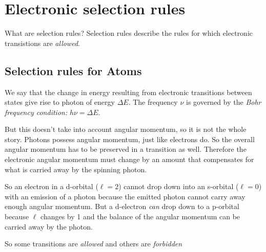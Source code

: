 \documentclass[a4paper,titlepage]{article}
\begin{document}
\section{Electronic selection rules}

\begin{frame}{What are selection rules?}
Selection rules describe the rules for which electronic transistions are \emph{allowed}. 
\end{frame}

\subsection{Selection rules for Atoms}

We say that the change in energy resulting from electronic transitions between states give rise to photon of energy \(\Delta E\). The frequency \(\nu\) is governed by the \textit{Bohr frequency condition:} \(h\nu = \Delta E\).

But this doesn't take into account angular momentum, so it is not the whole story. Photons possess angular momentum, just like electrons do. So the overall angular momentum has to be preserved in a transition as well. Therefore the electronic angular momentum must change by an amount that compensates for what is carried away by the spinning photon.

So an electron in a d-orbital (\(\ell = 2\)) cannot drop down into an s-orbital (\(\ell=0\)) with an emission of a photon because the emitted photon cannot carry away enough angular momentum. But a d-electron \textit{can} drop down to a p-orbital because \(\ell\) changes by 1 and the balance of the angular momentum can be carried away by the photon.

So some transitions are \textit{allowed} and others are \textit{forbidden}
\end{document}
